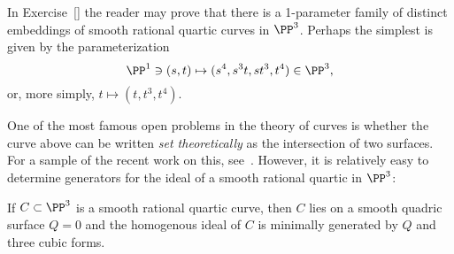 \begin{example}
In Exercise~\ref{} the reader may prove that there is a 1-parameter family of distinct embeddings of smooth rational quartic curves in $\PP^3$. Perhaps the simplest is given by the parameterization 
$$
\PP^1 \ni (s,t) \mapsto (s^4, s^3t, st^3, t^4)\in \PP^3,
$$
or, more simply, $t\mapsto(t, t^3, t^4)$. 
\end{example}


One of the most famous open problems in the theory of curves is whether the curve above
can be written \emph{set theoretically} as the intersection of two surfaces. For a sample of the recent
work on this, see~\cite{MR3356940}. However, it is relatively easy to determine generators for the
ideal of a smooth rational quartic in $\PP^3$:


\begin{proposition}\label{ideal of rational quartic}
If $C\subset \PP^3$ is a smooth rational quartic curve, then $C$ lies on a smooth quadric
surface $Q=0$ and the homogenous ideal of $C$ is minimally
generated by $Q$ and three cubic forms.
\end{proposition}

